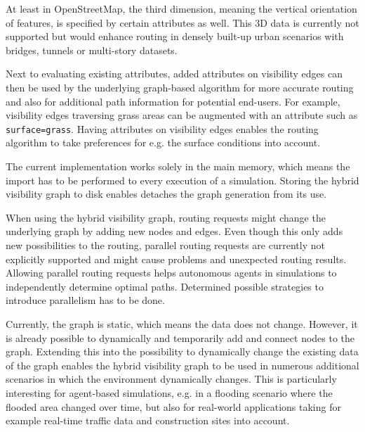 		At least in OpenStreetMap, the third dimension, meaning the vertical orientation of features, is specified by certain attributes as well.
		This 3D data is currently not supported but would enhance routing in densely built-up urban scenarios with bridges, tunnels or multi-story datasets.
		
		Next to evaluating existing attributes, added attributes on visibility edges can then be used by the underlying graph-based algorithm for more accurate routing and also for additional path information for potential end-users.
		For example, visibility edges traversing grass areas can be augmented with an attribute such as \texttt{surface=grass}.
		Having attributes on visibility edges enables the routing algorithm to take preferences for e.g. the surface conditions into account.
		
		The current implementation works solely in the main memory, which means the import has to be performed to every execution of a simulation.
		Storing the hybrid visibility graph to disk enables detaches the graph generation from its use.
		
		When using the hybrid visibility graph, routing requests might change the underlying graph by adding new nodes and edges.
		Even though this only adds new possibilities to the routing, parallel routing requests are currently not explicitly supported and might cause problems and unexpected routing results.
		Allowing parallel routing requests helps autonomous agents in simulations to independently determine optimal paths.
		Determined possible strategies to introduce parallelism has to be done.
		
		Currently, the graph is static, which means the data does not change.
		However, it is already possible to dynamically and temporarily add and connect nodes to the graph.
		Extending this into the possibility to dynamically change the existing data of the graph enables the hybrid visibility graph to be used in numerous additional scenarios in which the environment dynamically changes.
		This is particularly interesting for agent-based simulations, e.g. in a flooding scenario where the flooded area changed over time, but also for real-world applications taking for example real-time traffic data and construction sites into account.
		
